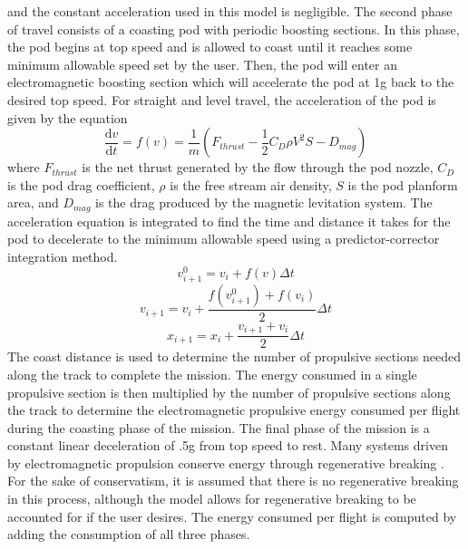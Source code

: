 	and the constant acceleration used in this model is negligible.
	The second phase of travel consists of a coasting pod with periodic boosting sections.
	In this phase, the pod begins at top speed and is allowed to coast until it
	reaches some minimum allowable speed set by the user.
	Then, the pod will enter an electromagnetic boosting section which will
	accelerate the pod at 1g back to the desired top speed.
	For straight and level travel, the acceleration of the pod is given by the equation
	\begin{equation}
		\label{eq:acceleration}
		\frac{\mathrm{d} v}{\mathrm{d} t} = f ( v  ) = \frac{1}{m} ( F_{thrust} - \frac{1}{2}C_{D}\rho V^{2}S - D_{mag})
	\end{equation}
	where $F_{thrust}$ is the net thrust generated by the flow through the pod
	nozzle, $C_D$ is the pod drag coefficient, $\rho$ is the free stream air
	density, $S$ is the pod planform area, and $D_{mag}$ is the drag produced
	by the magnetic levitation system. The acceleration equation is integrated
	to find the time and distance it takes for the pod to decelerate to the
	minimum allowable speed using a predictor-corrector integration method.
	\begin{equation}
		\label{eq:predictor_corrector}
		v_{i+1}^{0} = v_{i}+f(v)\Delta t
	\end{equation}
	\begin{equation}
		\label{eq:predictor_corrector_2}
		v_{i+1} = v_{i}+\frac{f(v_{i+1}^{0})+f(v_{i})}{2}\Delta t
	\end{equation}
	\begin{equation}
		\label{eq:predictor_corrector_3}
		x_{i+1} = x_{i}+\frac{v_{i+1}+v_{i}}{2}\Delta t
	\end{equation}
	The coast distance is used to determine the number of propulsive sections
	needed along the track to complete the mission. The energy consumed in a
	single propulsive section is then multiplied by the number of propulsive
	sections along the track to determine the electromagnetic propulsive energy
	consumed per flight during the coasting phase of the mission. The final
	phase of the mission is a constant linear deceleration of .5g from top
	speed to rest. Many systems driven by electromagnetic propulsion conserve
	energy through regenerative breaking \cite{inductrack}. For the sake of
	conservatism, it is assumed that there is no regenerative breaking in this
	process, although the model allows for regenerative breaking to be
	accounted for if the user desires. The energy consumed per flight is
	computed by adding the consumption of all three phases.


